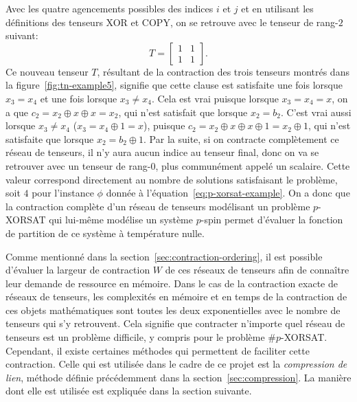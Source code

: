 Avec les quatre agencements possibles des indices $i$ et $j$ et en utilisant les définitions des tenseurs XOR et COPY, on se retrouve avec le tenseur de rang-$2$ suivant:
\begin{equation}
    T = \begin{bmatrix}
        1 & 1\\
        1 & 1
    \end{bmatrix}.
\end{equation}
Ce nouveau tenseur $T$, résultant de la contraction des trois tenseurs montrés dans la figure~\ref{fig:tn-example5}, signifie que cette clause est satisfaite une fois lorsque $x_3 = x_4$ et une fois lorsque $x_3 \ne x_4$.
Cela est vrai puisque lorsque $x_3 = x_4 = x$, on a que $c_2 = x_2 \oplus x \oplus x = x_2$, qui n'est satisfait que lorsque $x_2 = b_2$.
C'est vrai aussi lorsque $x_3 \ne x_4$ ($x_3 = x_4 \oplus 1 = x$), puisque $c_2 = x_2 \oplus x \oplus x \oplus 1 = x_2 \oplus 1$, qui n'est satisfaite que lorsque $x_2 = b_2 \oplus 1$.
Par la suite, si on contracte complètement ce réseau de tenseurs, il n'y aura aucun indice au tenseur final, donc on va se retrouver avec un tenseur de rang-$0$, plus communément appelé un scalaire.
Cette valeur correspond directement au nombre de solutions satisfaisant le problème, soit $4$ pour l'instance $\phi$ donnée à l'équation~\ref{eq:p-xorsat-example}.
On a donc que la contraction complète d'un réseau de tenseurs modélisant un problème $p$-XORSAT qui lui-même modélise un système $p$-spin permet d'évaluer la fonction de partition de ce système à température nulle.

Comme mentionné dans la section~\ref{sec:contraction-ordering}, il est possible d'évaluer la largeur de contraction $W$ de ces réseaux de tenseurs afin de connaître leur demande de ressource en mémoire.
Dans le cas de la contraction exacte de réseaux de tenseurs, les complexités en mémoire et en temps de la contraction de ces objets mathématiques sont toutes les deux exponentielles avec le nombre de tenseurs qui s'y retrouvent.
Cela signifie que contracter n'importe quel réseau de tenseurs est un problème difficile, y compris pour le problème \#$p$-XORSAT.
Cependant, il existe certaines méthodes qui permettent de faciliter cette contraction.
Celle qui est utilisée dans le cadre de ce projet est la \emph{compression de lien}, méthode définie précédemment dans la section~\ref{sec:compression}.
La manière dont elle est utilisée est expliquée dans la section suivante.




